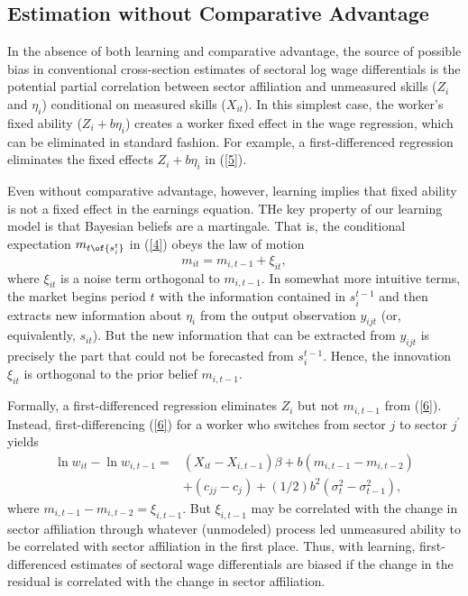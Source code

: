 \documentclass[12pt]{article}
\theoremstyle{definition}
\begin{document}
\subsection{Estimation without Comparative Advantage}

In the absence of both learning and comparative advantage, the source of possible bias in conventional cross-section estimates of sectoral log wage differentials is the potential partial correlation between sector affiliation and unmeasured skills ($Z_i$ and $\eta_i$) conditional on measured skills ($X_{it}$). In this simplest case, the worker's fixed ability ($Z_i + b \eta_i$) creates a worker fixed effect in the wage regression, which can be eliminated in standard fashion. For example, a first-differenced regression eliminates the fixed effects $Z_i + b \eta_i$ in (\ref{5}).

Even without comparative advantage, however, learning implies that fixed ability is not a fixed effect in the earnings equation. THe key property of our learning model is that Bayesian beliefs are a martingale. That is, the conditional expectation $m_{t\of{s_i^t}}$ in (\ref{4}) obeys the law of motion 
\begin{equation}
    \label{7}
    m_{it} = m_{i, t-1} + \xi_{it},
\end{equation}
where $\xi_{it}$ is a noise term orthogonal to $m_{i, t-1}$. In somewhat more intuitive terms, the market begins period $t$ with the information contained in $s_{i}^{t-1}$ and then extracts new information about $\eta_i$ from the output observation $y_{ijt}$ (or, equivalently, $s_{it}$). But the new information that can be extracted from $y_{ijt}$ is precisely the part that could not be forecasted from $s_{i}^{t-1}$. Hence, the innovation $\xi_{it}$ is orthogonal to the prior belief $m_{i, t-1}$.

Formally, a first-differenced regression eliminates $Z_i$ but not $m_{i,t-1}$ from (\ref{6}). Instead, first-differencing (\ref{6}) for a worker who switches from sector $j$ to sector $j^{\prime}$ yields 
\begin{equation}
    \label{8}
    \begin{aligned}
        \ln w_{i t}-\ln w_{i, t-1}= & \left(X_{i t}-X_{i, t-1}\right) \beta+b\left(m_{i, t-1}-m_{i, t-2}\right) \\
        & +\left(c_{j j}-c_j\right)+(1 / 2) b^2\left(\sigma_t^2-\sigma_{t-1}^2\right),
    \end{aligned}
\end{equation}
where $m_{i, t-1}-m_{i, t-2} = \xi_{i, t-1}$. But $\xi_{i, t-1}$ may be correlated with the change in sector affiliation through whatever (unmodeled) process led unmeasured ability to be correlated with sector affiliation in the first place. Thus, with learning, first-differenced estimates of sectoral wage differentials are biased if the change in the residual is correlated with the change in sector affiliation.
\end{document}
